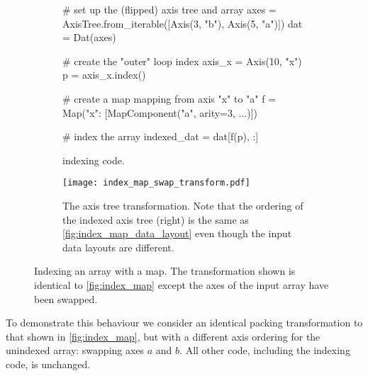 \documentclass[thesis]{subfiles}
\begin{document}
\begin{figure}
  \centering
  \begin{subfigure}{.9\textwidth}
    \begin{pyalg2}
      # set up the (flipped) axis tree and array
      axes = AxisTree.from_iterable([Axis(3, "b"), Axis(5, "a")])
      dat = Dat(axes)

      # create the "outer" loop index
      axis_x = Axis(10, "x")
      p = axis_x.index()

      # create a map mapping from axis "x" to "a"
      f = Map({"x": [MapComponent("a", arity=3, ...)]})

      # index the array
      indexed_dat = dat[f(p), :]
    \end{pyalg2}

    \caption{ indexing code.}
    \label{fig:index_map_swap_code}
  \end{subfigure}

  \vspace{1em}

  \begin{subfigure}{\textwidth}
    \centering
    \texttt{[image: index\_map\_swap\_transform.pdf]}
    \caption{
      The axis tree transformation.
      Note that the ordering of the indexed axis tree (right) is the same as \cref{fig:index_map_data_layout} even though the input data layouts are different.
    }
    \label{fig:index_map_swap_transform}
  \end{subfigure}

  \caption{
    Indexing an array with a map.
    The transformation shown is identical to \cref{fig:index_map} except the axes of the input array have been swapped.
  }
\end{figure}

To demonstrate this behaviour we consider an identical packing transformation to that shown in \cref{fig:index_map}, but with a different axis ordering for the unindexed array: swapping axes $a$ and $b$.
All other code, including the indexing code, is unchanged.
\end{document}
